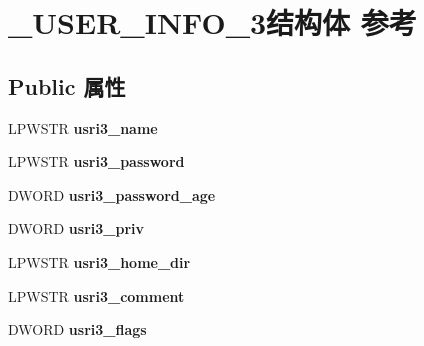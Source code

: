 \hypertarget{struct___u_s_e_r___i_n_f_o__3}{}\section{\+\_\+\+U\+S\+E\+R\+\_\+\+I\+N\+F\+O\+\_\+3结构体 参考}
\label{struct___u_s_e_r___i_n_f_o__3}
\subsection*{Public 属性}
\begin{DoxyCompactItemize}
\item 
\mbox{\label{struct___u_s_e_r___i_n_f_o__3_a55ca19779d464b5011dca643633b9618}} 
L\+P\+W\+S\+TR {\bfseries usri3\+\_\+name}
\item 
\mbox{\label{struct___u_s_e_r___i_n_f_o__3_a7e016934393b71228b863e7f0870aedd}} 
L\+P\+W\+S\+TR {\bfseries usri3\+\_\+password}
\item 
\mbox{\label{struct___u_s_e_r___i_n_f_o__3_a9431b31be977ecd9b0e881cb5f2986fb}} 
D\+W\+O\+RD {\bfseries usri3\+\_\+password\+\_\+age}
\item 
\mbox{\label{struct___u_s_e_r___i_n_f_o__3_a286f97b314ff893d9f226b133386bd41}} 
D\+W\+O\+RD {\bfseries usri3\+\_\+priv}
\item 
\mbox{\label{struct___u_s_e_r___i_n_f_o__3_a216918175fcd4a54234f815fd76eeb8f}} 
L\+P\+W\+S\+TR {\bfseries usri3\+\_\+home\+\_\+dir}
\item 
\mbox{\label{struct___u_s_e_r___i_n_f_o__3_a8c08184871ffe66968a437ec8fb13b85}} 
L\+P\+W\+S\+TR {\bfseries usri3\+\_\+comment}
\item 
\mbox{\label{struct___u_s_e_r___i_n_f_o__3_a9d8077e832e4ab29285eaa9594713b56}} 
D\+W\+O\+RD {\bfseries usri3\+\_\+flags}
\item 
\mbox{\label{struct___u_s_e_r___i_n_f_o__3_a24736df75dbb388ebc968adf03746fc0}} 

\end{DoxyCompactItemize}
